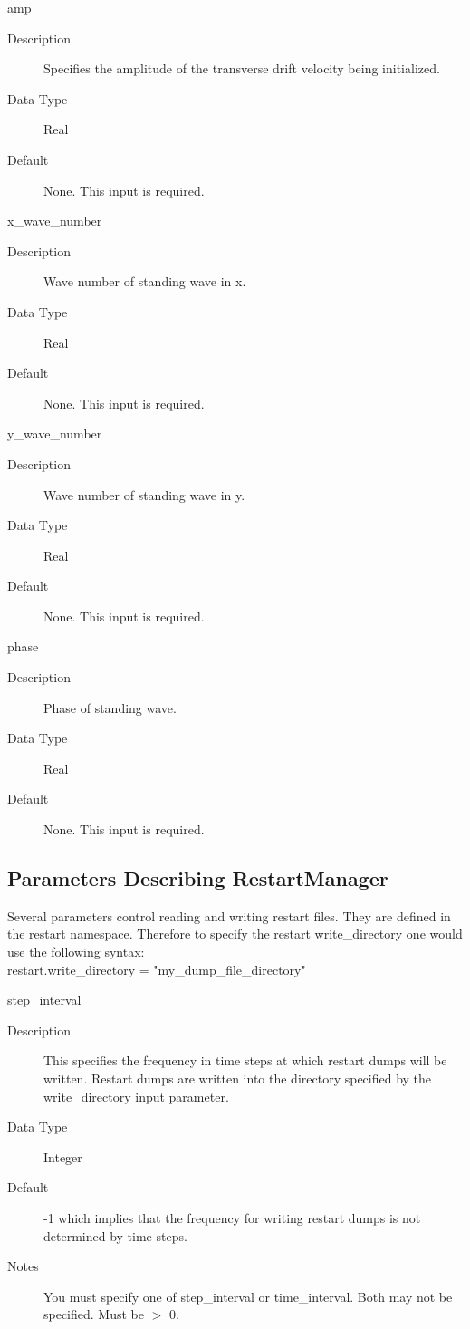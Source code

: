 \documentclass[11pt]{amsart}
\begin{document}
amp
\begin{description}
\item [Description] Specifies the amplitude of the transverse drift velocity
being initialized.
\item [Data Type] Real
\item [Default] None.  This input is required.
\end{description}

x\_wave\_number
\begin{description}
\item [Description] Wave number of standing wave in x.
\item [Data Type] Real
\item [Default] None.  This input is required.
\end{description}

y\_wave\_number
\begin{description}
\item [Description] Wave number of standing wave in y.
\item [Data Type] Real
\item [Default] None.  This input is required.
\end{description}

phase
\begin{description}
\item [Description] Phase of standing wave.
\item [Data Type] Real
\item [Default] None.  This input is required.
\end{description}

\subsection*{Parameters Describing RestartManager}
Several parameters control reading and writing restart files.  They are defined
in the restart namespace.  Therefore to specify the restart write\_directory
one would use the following syntax: \\
restart.write\_directory = "my\_dump\_file\_directory"

step\_interval
\begin{description}
\item [Description] This specifies the frequency in time steps at which restart
dumps will be written.  Restart dumps are written into the directory
specified by the write\_directory input parameter.
\item [Data Type] Integer
\item [Default] -1 which implies that the frequency for writing restart dumps
is not determined by time steps.
\item [Notes] You must specify one of step\_interval or time\_interval.  Both
may not be specified.  Must be $>$ 0.
\end{description}
\end{document}
